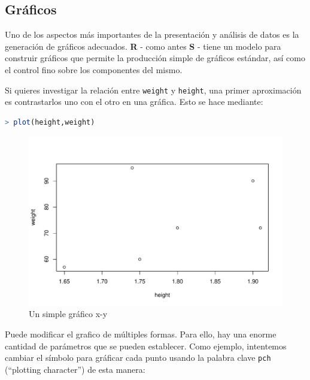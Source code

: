 \newpage
\subsection{Gráficos}\label{graficos}

Uno de los aspectos más importantes de la presentación y análisis de datos es
la generación de gráficos adecuados. \textbf{R} - como antes \textbf{S} - tiene
un modelo para construir gráficos que permite la producción simple de gráficos
estándar, así como el control fino sobre los componentes del mismo.

Si quieres investigar la relación entre  \texttt{weight} y \texttt{height}, una
primer aproximación es contrastarlos uno con el otro en una gráfica. Esto se
hace mediante:

\begin{lstlisting}[language=R]
> plot(height,weight)
\end{lstlisting}

\begin{figure}[H]
  \includegraphics[width=\linewidth]{img/fig-2.pdf}
  \caption{Un simple gráfico x-y}
  \label{fig-2}
\end{figure}


Puede modificar el grafico de múltiples formas. Para ello, hay una enorme
cantidad de parámetros que se pueden establecer. Como ejemplo, intentemos
cambiar el símbolo para gráficar cada punto usando la palabra clave
\texttt{pch} (``plotting character'') de esta manera:

